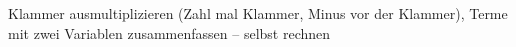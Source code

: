 \begin{aufgabe}{Klammer ausmultiplizieren (Zahl mal Klammer, Minus vor der Klammer), Terme mit zwei Variablen zusammenfassen – selbst rechnen}
\end{aufgabe}
